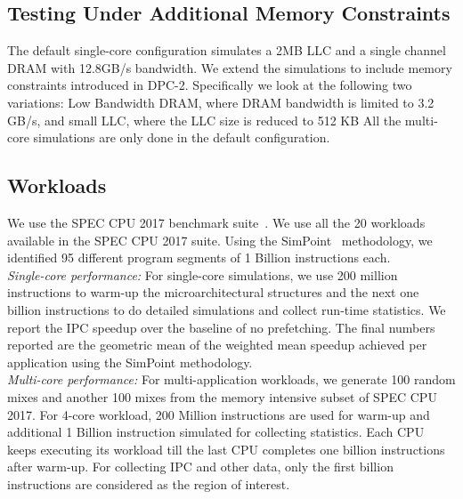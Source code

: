 \subsection{Testing Under Additional Memory Constraints}
\label{Method-AdditionalMem}
The default single-core configuration simulates a 2MB LLC and a single channel
DRAM with 12.8GB/s bandwidth. We extend the simulations to include memory
constraints introduced in DPC-2. Specifically we look at the following two
variations: Low Bandwidth DRAM, where DRAM bandwidth is limited to 3.2 GB/s,
and small LLC, where the LLC size is reduced to 512 KB All the multi-core
simulations are only done in the default configuration.

\subsection{Workloads}
\label{Method-Workloads}

We use the SPEC CPU 2017 benchmark suite~\cite{SPEC2017}. We use all the 20
workloads available in the SPEC CPU 2017 suite. Using the SimPoint~\cite{SimPoint}
methodology, we identified 95 different program segments of 1 Billion
instructions each.\\
%
\noindent \textit{Single-core performance:} For single-core simulations, we use 200
million instructions to warm-up the microarchitectural structures and the next
one billion instructions to do detailed simulations and collect run-time
statistics. We report the IPC speedup over the baseline of no prefetching.
The final numbers reported are the geometric mean of the weighted mean speedup 
achieved per application using the SimPoint methodology.\\
%
\noindent \textit{Multi-core performance:} For multi-application workloads, we generate
100 random mixes and another 100 mixes from the memory intensive subset of
SPEC CPU 2017. For 4-core workload, 200 Million instructions are used for warm-up
and additional 1 Billion instruction simulated for collecting statistics.
Each CPU keeps executing its workload till the last CPU completes one billion
instructions after warm-up. For collecting IPC and other data, only the first
billion instructions are considered as the region of interest.


